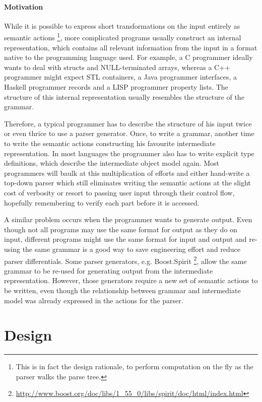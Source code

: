 \documentclass[10pt]{article}
\begin{document}
\paragraph{Motivation}
While it is possible to express short transformations on the input entirely as semantic actions
\footnote{This is in fact the design rationale, to perform computation on the fly as the parser
  walks the parse tree.}, more complicated programs usually construct an internal representation,
which contains all relevant information from the input in a format native to the programming
language used. For example, a C programmer ideally wants to deal with structs and NULL-terminated
arrays, whereas a C++ programmer might expect STL containers, a Java programmer interfaces, a
Haskell programmer records and a LISP programmer property lists. 
 The structure of this internal representation usually resembles the structure of the grammar. 

Therefore, a typical programmer has to describe the structure of his input twice or even thrice to
use a parser generator. Once, to write a grammar, another time to write the semantic actions
constructing his favourite intermediate representation. In most languages the programmer also has to
write explicit type definitions, which describe the intermediate object model again. Most
programmers will baulk at this multiplication of efforts and either hand-write a top-down parser
which still eliminates writing the semantic actions at the slight cost of verbosity or resort to
passing user input through their control flow, hopefully remembering to verify each part before
it is accessed. 

A similar problem occurs when the programmer wants to generate output. 
Even though not all programs may use the same format for output as they do on input, different
programs might use the same format for input and output and re-using the same grammar is a good way
to save engineering effort and reduce parser differentials.
Some parser generators, e.g.
Boost.Spirit \footnote{\url{http://www.boost.org/doc/libs/1_55_0/libs/spirit/doc/html/index.html}},
allow the same grammar to be re-used for generating output from the intermediate representation.
However, those generators require a new set of semantic actions to be written, even though the
relationship between grammar and intermediate model was already expressed in the actions for the
parser.

\section{Design}
\end{document}

